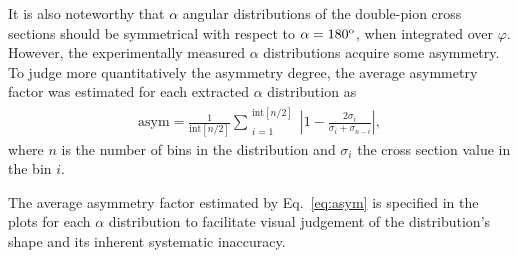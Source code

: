 


It is also noteworthy that $\alpha$ angular distributions of the double-pion cross sections should be symmetrical with respect to $\alpha = 180^{\rm o}$, when integrated over $\varphi$. However, the experimentally measured $\alpha$ distributions acquire some asymmetry. To judge more quantitatively the asymmetry degree, the average asymmetry factor was estimated for each extracted $\alpha$ distribution as
\begin{equation}
\begin{aligned}
\textrm{asym} = \frac{1}{\textrm{int} [ n/2]} \sum_{\substack{i = 1}}^{\substack{\textrm{int}[ n/2]}} \left | 1 - \frac{2\sigma_{i}}{\sigma_{i}+\sigma_{n-i}}\right |,
\label{eq:asym}
\end{aligned}
\end{equation}
where $n$ is the number of bins in the distribution and $\sigma_{i}$ the cross section value in the bin $i$.

The average asymmetry factor estimated by Eq.~\eqref{eq:asym} is specified in the plots for each $\alpha$ distribution to facilitate visual judgement of the distribution's shape and its inherent systematic inaccuracy.

